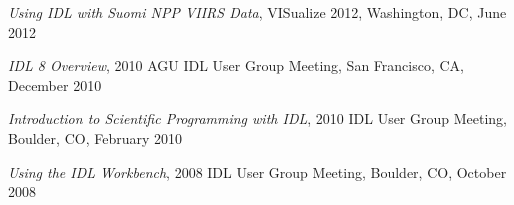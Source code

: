 \begin{enumerate}[{[}1{]}]
  \item \textit{Using IDL with Suomi NPP VIIRS Data}, {VISualize} 2012,
    Washington, DC, June 2012

  \item \textit{IDL 8 Overview}, 2010 AGU IDL User Group Meeting, San
    Francisco, CA, December 2010

  \item \textit{Introduction to Scientific Programming with IDL}, 2010 IDL
    User Group Meeting, Boulder, CO, February 2010

  \item \textit{Using the IDL Workbench}, 2008 IDL User Group Meeting,
    Boulder, CO, October 2008

\end{enumerate}
